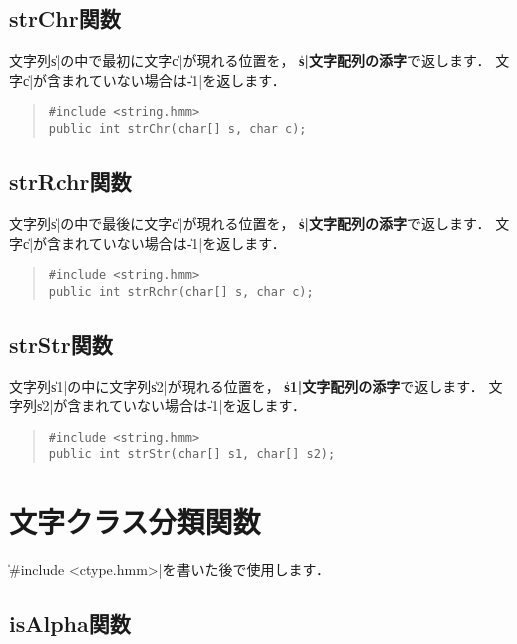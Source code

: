 \subsection{strChr関数}

文字列\|s|の中で最初に文字\|c|が現れる位置を，
{\bf\|s|文字配列の添字}で返します．
文字\|c|が含まれていない場合は\|-1|を返します．

\begin{quote}
\begin{verbatim}
#include <string.hmm>
public int strChr(char[] s, char c);
\end{verbatim}
\end{quote}

\subsection{strRchr関数}

文字列\|s|の中で最後に文字\|c|が現れる位置を，
{\bf\|s|文字配列の添字}で返します．
文字\|c|が含まれていない場合は\|-1|を返します．

\begin{quote}
\begin{verbatim}
#include <string.hmm>
public int strRchr(char[] s, char c);
\end{verbatim}
\end{quote}

\subsection{strStr関数}

文字列\|s1|の中に文字列\|s2|が現れる位置を，
{\bf\|s1|文字配列の添字}で返します．
文字列\|s2|が含まれていない場合は\|-1|を返します．

\begin{quote}
\begin{verbatim}
#include <string.hmm>
public int strStr(char[] s1, char[] s2);
\end{verbatim}
\end{quote}

\section{文字クラス分類関数}

\|#include <ctype.hmm>|を書いた後で使用します．

\subsection{isAlpha関数}

